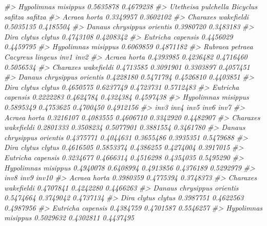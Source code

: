 \documentclass[
]{article}
\newenvironment{Shaded}{\begin{snugshade}}{\end{snugshade}}
\newcommand{\CommentTok}[1]{\textcolor[rgb]{0.56,0.35,0.01}{\textit{#1}}}
\begin{document}
\begin{Shaded}
\begin{Highlighting}[]
\CommentTok{\#\textgreater{} Hypolimnas misippus                        0.5635878           0.4679238}
\CommentTok{\#\textgreater{}                            Utetheisa pulchella Bicyclus safitza safitza}
\CommentTok{\#\textgreater{} Acraea horta                         0.3349957                0.3602102}
\CommentTok{\#\textgreater{} Charaxes wakefieldi                  0.5035135                0.4185504}
\CommentTok{\#\textgreater{} Danaus chrysippus orientis           0.3980720                0.3483183}
\CommentTok{\#\textgreater{} Dira clytus clytus                   0.4743108                0.4208342}
\CommentTok{\#\textgreater{} Eutricha capensis                    0.4456029                0.4459795}
\CommentTok{\#\textgreater{} Hypolimnas misippus                  0.6069859                0.4871182}
\CommentTok{\#\textgreater{}                            Rubraea petraea Cacyreus lingeus      inv1      inv2}
\CommentTok{\#\textgreater{} Acraea horta                     0.4393985        0.4236482 0.4716460 0.5056534}
\CommentTok{\#\textgreater{} Charaxes wakefieldi              0.4713585        0.3091901 0.3303897 0.4057451}
\CommentTok{\#\textgreater{} Danaus chrysippus orientis       0.4228180        0.5471794 0.4526810 0.4403851}
\CommentTok{\#\textgreater{} Dira clytus clytus               0.4650575        0.6237749 0.4723731 0.5712483}
\CommentTok{\#\textgreater{} Eutricha capensis                0.2222283        0.4624784 0.4324384 0.4597438}
\CommentTok{\#\textgreater{} Hypolimnas misippus              0.5895349        0.4753625 0.4700450 0.4912156}
\CommentTok{\#\textgreater{}                                 inv3      inv4      inv5      inv6      inv7}
\CommentTok{\#\textgreater{} Acraea horta               0.3216107 0.4083555 0.4606710 0.3342920 0.4482907}
\CommentTok{\#\textgreater{} Charaxes wakefieldi        0.2801333 0.3508234 0.5077901 0.3881554 0.3461780}
\CommentTok{\#\textgreater{} Danaus chrysippus orientis 0.4375771 0.4044631 0.3655486 0.3935351 0.5479688}
\CommentTok{\#\textgreater{} Dira clytus clytus         0.4616505 0.5853374 0.4386255 0.4274004 0.3917015}
\CommentTok{\#\textgreater{} Eutricha capensis          0.3234677 0.4666314 0.4516298 0.4354035 0.5495290}
\CommentTok{\#\textgreater{} Hypolimnas misippus        0.4940078 0.6408994 0.4913856 0.4376189 0.5292979}
\CommentTok{\#\textgreater{}                                 inv8      inv9     inv10}
\CommentTok{\#\textgreater{} Acraea horta               0.3980359 0.4775394 0.3748373}
\CommentTok{\#\textgreater{} Charaxes wakefieldi        0.4707841 0.4242280 0.4466263}
\CommentTok{\#\textgreater{} Danaus chrysippus orientis 0.5474664 0.3749042 0.4737134}
\CommentTok{\#\textgreater{} Dira clytus clytus         0.3987751 0.4622563 0.4987956}
\CommentTok{\#\textgreater{} Eutricha capensis          0.4384759 0.4701587 0.5546257}
\CommentTok{\#\textgreater{} Hypolimnas misippus        0.5029632 0.4302811 0.4437495}
\end{Highlighting}
\end{Shaded}
\end{document}
